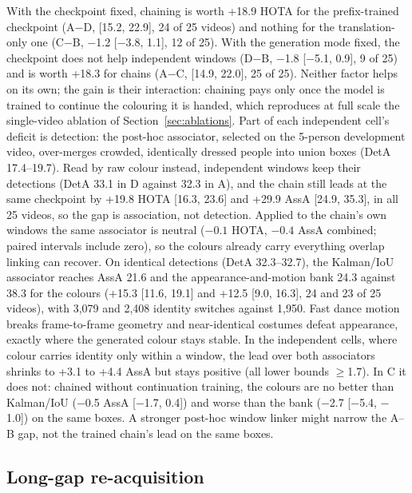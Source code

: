 \documentclass{article} %
\newcommand{\rev}[1]{#1}
\begin{document}
\rev{With the checkpoint fixed, chaining is worth +18.9 HOTA for the prefix-trained
checkpoint (A$-$D, [15.2, 22.9], 24 of 25 videos) and nothing for the translation-only one
(C$-$B, $-$1.2 [$-$3.8, 1.1], 12 of 25). With the generation mode fixed, the checkpoint
does not help independent windows (D$-$B, $-$1.8 [$-$5.1, 0.9], 9 of 25) and is worth +18.3
for chains (A$-$C, [14.9, 22.0], 25 of 25). Neither factor helps on its own; the gain is
their interaction: chaining pays only once the model is trained
to continue the colouring it is handed, which reproduces at full scale the single-video
ablation of Section~\ref{sec:ablations}. Part of each independent cell's deficit is detection: the post-hoc associator,
selected on the 5-person development video, over-merges crowded, identically dressed
people into union boxes (DetA 17.4--19.7). Read by raw colour instead, independent
windows keep their detections (DetA 33.1 in D against 32.3 in A), and the chain still leads
at the same checkpoint by +19.8 HOTA [16.3, 23.6] and +29.9 AssA [24.9, 35.3], in all 25
videos, so the gap is association, not detection.} Applied to the chain's own
windows the same associator is neutral ($-0.1$ HOTA, $-0.4$ AssA combined\rev{; paired
intervals include zero}), so the colours already
carry everything overlap linking can recover. On identical detections (DetA 32.3--32.7), the Kalman/IoU
associator reaches AssA 21.6 and the appearance-and-motion bank 24.3 against 38.3 for the
colours \rev{(+15.3 [11.6, 19.1] and +12.5 [9.0, 16.3], 24 and 23 of 25 videos)}, with
3,079 and 2,408 identity switches against 1,950. Fast dance motion breaks
frame-to-frame geometry and near-identical costumes defeat appearance, exactly where the
generated colour stays stable. \rev{In the independent cells, where colour
carries identity only within a window, the lead over both associators shrinks to +3.1 to
+4.4 AssA but stays positive (all lower bounds $\geq$1.7). In C it does not: chained without
continuation training, the colours are no better than Kalman/IoU ($-$0.5 AssA [$-$1.7, 0.4])
and worse than the bank ($-$2.7 [$-$5.4, $-$1.0]) on the same boxes.} A stronger post-hoc
\rev{window linker} might narrow the A--B gap\rev{, not the trained chain's lead on the same
boxes}.

\subsection{Long-gap re-acquisition}
\label{sec:reacq}
\end{document}
